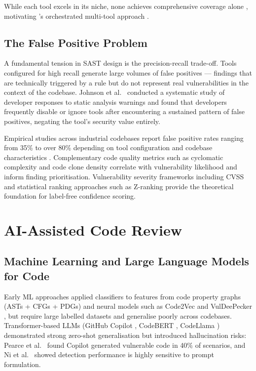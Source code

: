 While each tool excels in its niche, none achieves comprehensive coverage alone \cite{bandit_tool,semgrep_tool,gosec_tool,eslint_security}, motivating \ACRQA{}'s orchestrated multi-tool approach \cite{ayewah2008using}.

\subsection{The False Positive Problem}

A fundamental tension in SAST design is the precision-recall trade-off. Tools configured for high recall generate large volumes of false positives --- findings that are technically triggered by a rule but do not represent real vulnerabilities in the context of the codebase. Johnson et al.\ \cite{johnson2013dont} conducted a systematic study of developer responses to static analysis warnings and found that developers frequently disable or ignore tools after encountering a sustained pattern of false positives, negating the tool's security value entirely.

Empirical studies across industrial codebases report false positive rates ranging from 35\% to over 80\% depending on tool configuration and codebase characteristics \cite{muske2016survey}. Complementary code quality metrics such as cyclomatic complexity \cite{mccabe1976complexity} and code clone density \cite{roy2009comparison} correlate with vulnerability likelihood and inform finding prioritisation. Vulnerability severity frameworks including CVSS \cite{cvss_v3} and statistical ranking approaches such as Z-ranking \cite{kremenek2003z} provide the theoretical foundation for label-free confidence scoring.

\section{AI-Assisted Code Review}
\label{sec:ai_code_review}

\subsection{Machine Learning and Large Language Models for Code}

Early ML approaches applied classifiers to features from code property graphs (ASTs + CFGs + PDGs) \cite{yamaguchi2014modeling} and neural models such as Code2Vec \cite{alon2019code2vec} and VulDeePecker \cite{li2018vuldeepecker}, but require large labelled datasets and generalise poorly across codebases. Transformer-based LLMs (GitHub Copilot \cite{chen2021evaluating}, CodeBERT \cite{feng2020codebert}, CodeLlama \cite{roziere2023code}) demonstrated strong zero-shot generalisation \cite{thapa2022transformer} but introduced hallucination risks: Pearce et al.\ \cite{pearce2022asleep} found Copilot generated vulnerable code in 40\% of scenarios, and Ni et al.\ \cite{ni2023chatgpt} showed detection performance is highly sensitive to prompt formulation.

